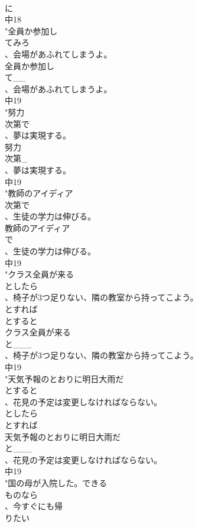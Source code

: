 \documentclass[8pt]{extreport}
\begin{document}
\begin{CJK}{UTF8}{min}
\\	に
\\	中18
\\	"全員か参加し
\\	てみろ
\\	、会場があふれてしまうよ。
\\	全員か参加し
\\	て__
\\	、会場があふれてしまうよ。
\\	中19
\\	"努力
\\	次第で
\\	、夢は実現する。
\\	努力
\\	次第_
\\	、夢は実現する。
\\	中19
\\	"教師のアイディア
\\	次第で
\\	、生徒の学力は伸びる。
\\	教師のアイディア
\\	で
\\	、生徒の学力は伸びる。
\\	中19
\\	"クラス全員が来る
\\	としたら
\\	、椅子が3つ足りない、隣の教室から持ってこよう。
\\	とすれば
\\	とすると
\\	クラス全員が来る
\\	と___
\\	、椅子が3つ足りない、隣の教室から持ってこよう。
\\	中19
\\	"天気予報のとおりに明日大雨だ
\\	とすると
\\	、花見の予定は変更しなければならない。
\\	としたら 
\\	とすれば
\\	天気予報のとおりに明日大雨だ
\\	と___
\\	、花見の予定は変更しなければならない。
\\	中19
\\	"国の母が入院した。できる
\\	ものなら
\\	、今すぐにも帰
\\	りたい

\end{CJK}
\end{document}
